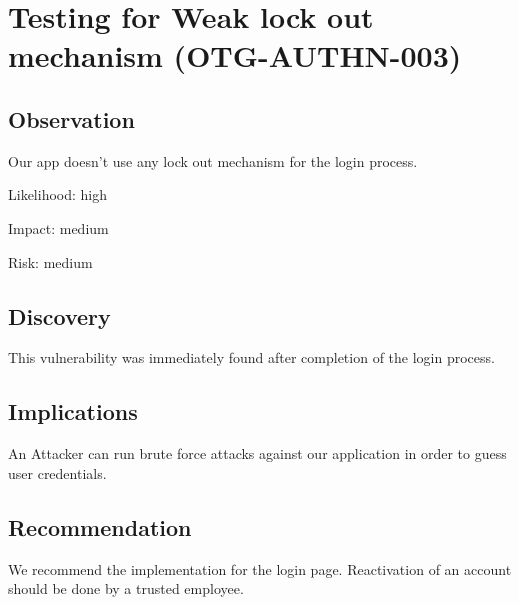 \section{Testing for Weak lock out mechanism (OTG-AUTHN-003)}
\subsection{Observation}
Our app doesn't use any lock out mechanism for the login process. 

Likelihood: high \newline

Impact: medium\newline

Risk: medium\newline
\subsection{Discovery}
This vulnerability was immediately found after completion of the login process.
\subsection{Implications}
An Attacker can run brute force attacks against our application in order to guess user credentials.
\subsection{Recommendation}
We recommend the implementation for the login page. Reactivation of an account should be done by a trusted employee.